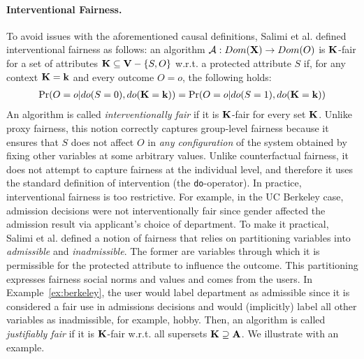 \documentclass[11pt]{article}
\begin{document}
\paragraph*{\bf Interventional Fairness.} To avoid issues with the aforementioned causal definitions, Salimi et al. \cite{salimi2019interventional} defined interventional fairness as follows: an
  algorithm $\mathcal{A} : Dom({\mathbf{X}}) \rightarrow Dom(O)$ is ${\mathbf{K}}$-fair for a set of
  attributes ${\mathbf{K}} \subseteq {\mathbf{V}}-\{S,O\}$  w.r.t. a protected attribute $S$ if, for any context ${\mathbf{K}} = {\mathbf{k}}$
  and every outcome $O=o$, the following holds:
	{ 
	\begin{eqnarray}
	{\tt \mathrm{Pr}}(O=o| do(S=0),do({\mathbf{K}} = {\mathbf{k}}))= {\tt \mathrm{Pr}}(O=o| do(S=1), do({\mathbf{K}} = {\mathbf{k}})) \label{eq:cfair1}
	\end{eqnarray}
}
%
\noindent An algorithm is called {\em interventionally fair} if it is
  ${\mathbf{K}}$-fair for every set ${\mathbf{K}}$.  Unlike proxy fairness, this
  notion correctly captures group-level fairness because it ensures
  that $S$ does not affect $O$ in \emph{any configuration} of the
  system obtained by fixing other variables at some arbitrary values.
  Unlike counterfactual fairness, it does not attempt to capture
  fairness at the individual level, and therefore it uses the standard
  definition of intervention (the \texttt{do}-operator).  In practice, interventional fairness is too restrictive. For example, in the UC Berkeley case, admission decisions were not interventionally fair since gender affected the admission result via applicant's choice of department. To make it practical, Salimi et al. \cite{salimi2019interventional} defined a notion of fairness that relies on partitioning variables into {\em admissible} and {\em inadmissible}.  The former are variables
through which it is permissible for the protected attribute to
influence the outcome.  This partitioning expresses fairness social norms and values and comes from the users. In Example~\ref{ex:berkeley}, the user would
label department as admissible since it is considered a fair use in
admissions decisions and would (implicitly) label all other variables
as inadmissible, for example, hobby. Then, an algorithm is called {\em justifiably fair} if it is ${\mathbf{K}}$-fair w.r.t. all supersets ${\mathbf{K}} \supseteq {\mathbf{A}}$.  We illustrate with an example.
\end{document}
